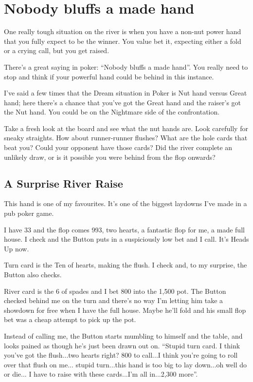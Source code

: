 \chapter{Nobody bluffs a made hand}


One really tough situation on the river is when you have a
non-nut power hand that you fully expect to be the winner.
You value bet it, expecting either a fold or a crying call,
but you get raised.

There's a great saying in poker: ``Nobody bluffs a made hand''. 
You really need to stop and think if your powerful hand could
be behind in this instance.

I've said a few times that the Dream situation in
Poker is Nut hand versus Great hand; here there's a chance
that you've got the Great hand and the raiser's got the Nut hand.
You could be on the Nightmare side of the confrontation.

Take a fresh look at the board and see what the nut hands are.
Look carefully for sneaky straights. How about runner-runner flushes?
What are the hole cards that beat you? Could your opponent
have those cards? Did the river complete an unlikely draw, or is it
possible you were behind from the flop onwards?

\section{A Surprise River Raise}

This hand is one of my favourites. It's one of the biggest
laydowns I've made in a pub poker game.

I have 33 and the flop comes 993, two hearts, a fantastic
flop for me, a made full house. I check and the Button puts in a
suspiciously low bet and I call. It's Heads Up now.

Turn card is the Ten of hearts, making the flush. I check and, to my
surprise, the Button also checks.

River card is the 6 of spades and I bet 800 into the 1,500 pot. The Button
checked behind me on the turn and there's no way I'm letting him
take a showdown for free when I have the full house. Maybe he'll fold
and his small flop bet was a cheap attempt to pick up the pot.

Instead of calling me, the Button starts mumbling to himself and the
table, and looks pained as though he's just been drawn out on.
``Stupid turn card. I think you've got the flush...two hearts right?
800 to call...I think you're going to roll over that flush on me...
stupid turn...this hand is too big to lay down...oh well do or die...
I have to raise with these cards...I'm all in...2,300 more''.

